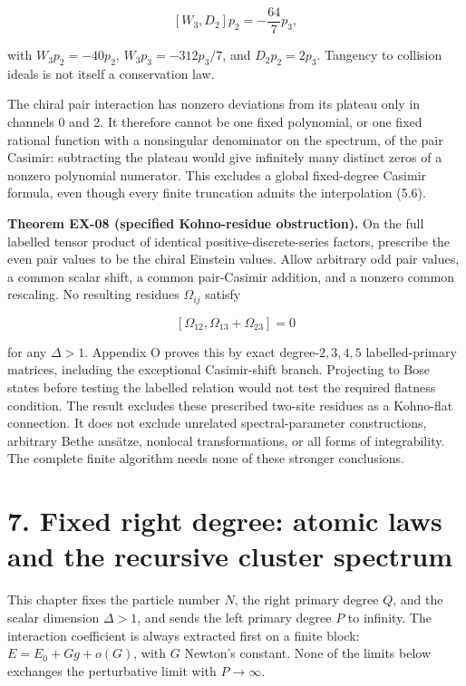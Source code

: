 \documentclass[a4paper,11pt]{article}
\numberwithin{equation}{section}
\begin{document}
\[
[W_3,D_2]p_2=-\frac{64}{7}p_3,
\tag{6.57}
\]

with \(W_3p_2=-40p_2\), \(W_3p_3=-312p_3/7\), and \(D_2p_2=2p_3\). Tangency to collision ideals is not itself a conservation law.

The chiral pair interaction has nonzero deviations from its plateau only in channels 0 and 2. It therefore cannot be one fixed polynomial, or one fixed rational function with a nonsingular denominator on the spectrum, of the pair Casimir: subtracting the plateau would give infinitely many distinct zeros of a nonzero polynomial numerator. This excludes a global fixed-degree Casimir formula, even though every finite truncation admits the interpolation (5.6).

\textbf{Theorem EX-08 (specified Kohno-residue obstruction).} On the full labelled tensor product of identical positive-discrete-series factors, prescribe the even pair values to be the chiral Einstein values. Allow arbitrary odd pair values, a common scalar shift, a common pair-Casimir addition, and a nonzero common rescaling. No resulting residues \(\Omega_{ij}\) satisfy

\[
[\Omega_{12},\Omega_{13}+\Omega_{23}]=0
\tag{6.58}
\]

for any \(\Delta>1\). Appendix O proves this by exact degree-\(2,3,4,5\) labelled-primary matrices, including the exceptional Casimir-shift branch. Projecting to Bose states before testing the labelled relation would not test the required flatness condition. The result excludes these prescribed two-site residues as a Kohno-flat connection. It does not exclude unrelated spectral-parameter constructions, arbitrary Bethe ansätze, nonlocal transformations, or all forms of integrability. The complete finite algorithm needs none of these stronger conclusions.

\clearpage
\hypertarget{fixed-right-degree-atomic-laws-and-the-recursive-cluster-spectrum}{%
\section{7. Fixed right degree: atomic laws and the recursive cluster spectrum}\label{fixed-right-degree-atomic-laws-and-the-recursive-cluster-spectrum}}

This chapter fixes the particle number \(N\), the right primary degree \(Q\), and the scalar dimension \(\Delta>1\), and sends the left primary degree \(P\) to infinity. The interaction coefficient is always extracted first on a finite block: \(E=E_0+Gg+o(G)\), with \(G\) Newton's constant. None of the limits below exchanges the perturbative limit with \(P\to\infty\).
\end{document}
